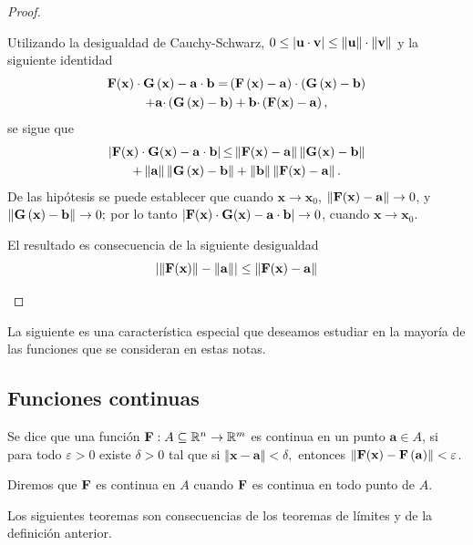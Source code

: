 \begin{proof}
\begin{parrafonumerado}
  \item Utilizando la desigualdad de Cauchy-Schwarz,
    $0\leq \left\vert \mathbf{u}\cdot \mathbf{v}\right\vert \leq \left\Vert
    \mathbf{u}\right\Vert \cdot \left\Vert \mathbf{v}\right\Vert $
    y la siguiente identidad
    \begin{multline*}
      \mathbf{F}(\mathbf{x}) \cdot \mathbf{G}\left( \mathbf{x}\right) -\mathbf{a\cdot b=}\left( \mathbf{F}\left( \mathbf{x}\right) -\mathbf{a}\right) \cdot \left( \mathbf{G}\left( \mathbf{x} \right) -\mathbf{b}\right) \\
      +\mathbf{a\cdot }\left( \mathbf{G}\left( \mathbf{x}\right) -\mathbf{b}\right) +\mathbf{b\cdot }\left( \mathbf{F}(\mathbf{x}) -\mathbf{a}\right),
    \end{multline*}
    se sigue que
    \begin{multline*}
      \left\vert \ve{F}(\mathbf{x}) \cdot \ve{G}(\mathbf{x}) -\mathbf{a\cdot b}\right\vert \mathbf{\leq }%
      \left\Vert \ve{F}(\mathbf{x}) -\mathbf{a}\right\Vert \left\Vert \ve{G}(\mathbf{x}) -\mathbf{b}\right\Vert \\
      +\left\Vert \mathbf{a}\right\Vert \left\Vert \ve{G}\left( \mathbf{x}\right) -\mathbf{b}\right\Vert +\left\Vert \mathbf{b}\right\Vert \left\Vert \ve{F}(\mathbf{x}) -\mathbf{a}\right\Vert.
    \end{multline*}
    De las hipótesis se puede establecer que cuando $\mathbf{x\to x }_{0}$,
    $\left\Vert \mathbf{F}(\mathbf{x}) -\mathbf{a} \right\Vert \to 0$,
    y $\left\Vert \mathbf{G}\left( \mathbf{x} \right) -\mathbf{b}\right\Vert \to 0;$
    por lo tanto
    $\left\vert \mathbf{F}(\mathbf{x}) \cdot \mathbf{G}(\mathbf{x}) -\mathbf{a\cdot b}\right\vert \to 0$,
    cuando $\mathbf{x\to x}_{0}$.
  \item El resultado es consecuencia de la siguiente desigualdad
    $$\left\vert \left\Vert \mathbf{F}(\mathbf{x})\right\Vert -\left\Vert \mathbf{a}\right\Vert \right\vert \leq \left\Vert
    \mathbf{F}(\mathbf{x}) -\mathbf{a}\right\Vert $$
  \end{parrafonumerado}
\end{proof}

La siguiente es una característica especial que deseamos estudiar en la mayoría de las funciones que se consideran
en estas notas.

\subsection{Funciones continuas}
\begin{defi} 
  Se dice que una función $\mathbf{F}:A\subseteq \mathbb{R}^n\to \mathbb{R}^m$ es continua en un punto
  $\mathbf{a}\in A$, si para todo $\varepsilon >0$ existe $\delta >0$ tal que si
  $\left\Vert \mathbf{x}-\mathbf{a}\right\Vert <\delta, $ entonces
  $\left\Vert \mathbf{F}(\mathbf{x}) -\mathbf{F}\left( \mathbf{a}\right) \right\Vert <\varepsilon $.

  Diremos que $\mathbf{F}$ es continua en $A$ cuando $\mathbf{F}$ es continua en todo punto de $A$.
\end{defi}
Los siguientes teoremas son consecuencias de los teoremas de límites y de la definición anterior.

